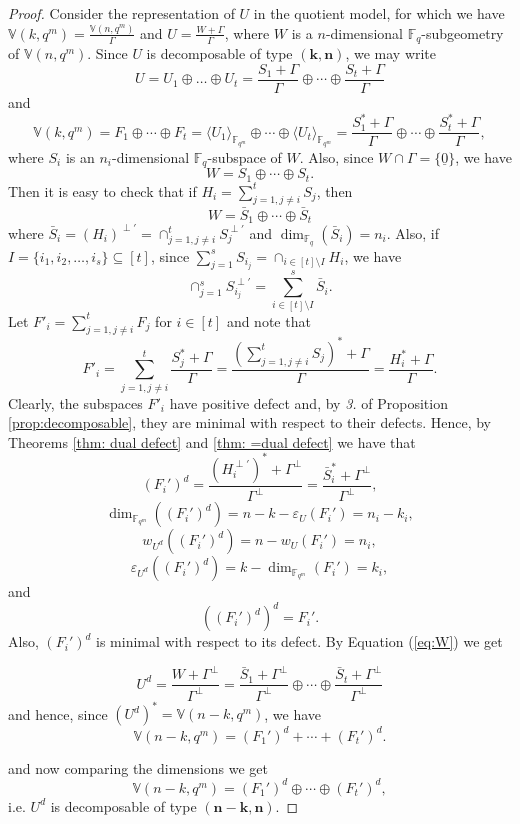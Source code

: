 \documentclass[11pt]{amsart}
\newcommand{\fqm}{\mathbb{F}_{q^m}}
\newcommand{\fq}{{\mathbb F}_{q}}
\begin{document}
\begin{proof}
   Consider the representation of $U$ in the quotient model, for which we have $\mathbb{V}(k,q^m)=\frac{\mathbb{V}(n,q^m)}{\Gamma}$ and  $U=\frac{W+\Gamma}{\Gamma}$, where $W$ is a $n$-dimensional $\fq$-subgeometry of $\mathbb{V}(n,q^m)$. Since $U$ is decomposable of type $(\mathbf{k},\mathbf{n})$, we may write
   \[U=U_1\oplus \ldots \oplus U_t=\frac{S_1+\Gamma}{\Gamma}\oplus \cdots \oplus \frac{S_t+\Gamma}{\Gamma}\]
   and 
   \[\mathbb{V}(k,q^m)=F_1\oplus  \cdots \oplus F_t=\langle U_1 \rangle_{\fqm}\oplus \cdots \oplus \langle U_t\rangle_{\fqm}=\frac{S_1^*+\Gamma}{\Gamma}\oplus \cdots \oplus \frac{S_t^*+\Gamma}{\Gamma},\]
   where $S_i$ is an $n_i$-dimensional $\fq$-subspace of $W$.
   Also, since $W\cap \Gamma=\{\underline 0\}$, we have
   \[W=S_1\oplus \cdots \oplus S_t.\]
   Then it is easy to check that if $H_i=\sum_{j=1, j\neq i}^{t}S_j$, then 
   \begin{equation} \label{eq:W}
       W=\bar{S}_1\oplus \cdots \oplus \bar{S}_t
   \end{equation}
   where $\bar{S}_i=(H_i)^{\perp'}=\cap_{j=1, j\neq i}^{t} S_j^{\perp'}$ and $\dim_{\fq}(\bar{S}_i)=n_i$. 
   Also, if $I=\{i_1,i_2,\dots, i_s\} \subseteq [t]$, since $\sum_{j=1}^s S_{i_j}=\cap_{i\in [t]\setminus I} H_i $, we have  
   \begin{equation} \label{Eq:S partial sum}
      \cap_{j=1}^{s}S_{i_j} ^{\perp'}=\sum_{i\in [t]\setminus I}^{s}\bar{S}_i.
   \end{equation}
   Let $F'_i=\sum_{j=1, j\neq i}^{t}F_j$ for $i\in [t]$ and note that 
   \[F'_i=\sum_{j=1, j\neq i}^{t} \frac{S_j^*+\Gamma}{\Gamma}=\frac{(\sum_{j=1, j\neq i}^{t}S_j)^*+\Gamma}{\Gamma}=\frac{H_i^*+\Gamma}{\Gamma}.\]
   Clearly, the subspaces $F'_i$ have positive defect and, by {\it 3.} of Proposition \ref{prop:decomposable}, they are  minimal with respect to their defects. Hence, by Theorems \ref{thm: dual defect} and  \ref{thm: =dual defect} we have that 
   \[(F_i')^d=\frac{(H_i^{\perp'})^*+\Gamma^{\perp}}{\Gamma^{\perp}}=\frac{\bar{S}_i^*+\Gamma^{\perp}}{\Gamma^{\perp}},\]
   \[\dim_{\fqm}((F_i')^d)=n-k-\varepsilon_U(F_i')=n_i-k_i,\] 
   \[ w_{U^d}((F_i')^d)=n-w_U(F_i')=n_i,\] 
   \[\varepsilon_{U^d}((F_i')^d)=k-\dim_{\fqm}(F_i')=k_i,\] 
   and
   \[((F_i')^d)^d=F_i'.\]
   Also, $(F_i')^d$ is minimal with respect to its defect. By Equation (\ref{eq:W}) we get
   
   \begin{equation} \label{eq:decomposition_Ud}
       U^d=\frac{W+\Gamma^{\perp}}{\Gamma^{\perp}}=\frac{\bar{S}_1+\Gamma^{\perp}}{\Gamma^{\perp}}\oplus\cdots\oplus \frac{\bar{S}_t+\Gamma^{\perp}}{\Gamma^{\perp}}
   \end{equation}
   and hence, since $(U^d)^*=\mathbb{V}(n-k,q^m)$, we have
   \[\mathbb{V}(n-k,q^m)=(F_1')^d+\cdots +(F_t')^d.\]
   
and now comparing the dimensions we get
\begin{equation} \label{eq:decomposition_Vd}
\mathbb{V}(n-k,q^m)=(F_1')^d\oplus\cdots \oplus (F_t')^d,
\end{equation}
i.e. $U^d$ is decomposable of type $(\mathbf{n}-\mathbf{k}, \mathbf{n})$.
\end{proof}
\end{document}
